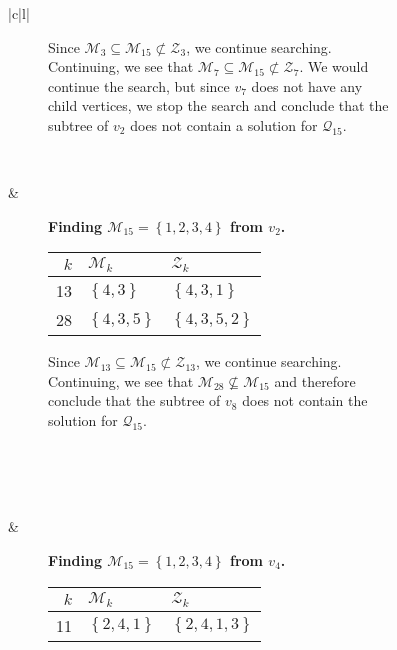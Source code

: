\begin{figure}[ht!]
\begin{tabular}[t]{|c|l|}
\begin{subfigure}[b]{0.64\textwidth}
        Since $\mathcal{M}_3 \subseteq \mathcal{M}_{15} \not \subset
        \mathcal{Z}_3$, we continue searching. Continuing, we see that
        $\mathcal{M}_7 \subseteq \mathcal{M}_{15} \not \subset \mathcal{Z}_7$.
        We would continue the search, but since $v_7$ does not have any child
        vertices, we stop the search and conclude that the subtree of $v_2$
        does not contain a solution for $\mathcal{Q}_{15}$.
        \\
    \end{subfigure}
    \\ \hline
    \begin{subfigure}[b]{0.35\textwidth}
        \centering
        
    \end{subfigure}
    & 
    \begin{subfigure}[b]{0.64\textwidth}
        \textbf{Finding $\mathcal{M}_{15} = \left\{{1,2,3,4}\right\}$ from $v_2$.} \\
        \begin{tabular}{rll}
            $k$ & $\mathcal{M}_k$            & $\mathcal{Z}_k$ \\ \hline
            13        & $\left\{{4,3}\right\}$     & $\left\{{4,3,1}\right\}$ \\ 
            28        & $\left\{{4,3,5}\right\}$   & $\left\{{4,3,5,2}\right\}$ \\ 
        \end{tabular}

        Since $\mathcal{M}_{13} \subseteq \mathcal{M}_{15} \not \subset
        \mathcal{Z}_{13}$, we continue searching. Continuing, we see that
        $\mathcal{M}_{28} \not \subseteq \mathcal{M}_{15}$ and therefore
        conclude that the subtree of $v_8$ does not contain the solution for
        $\mathcal{Q}_{15}$.
        \\
        \\
        \\
    \end{subfigure}
    \\ \hline
    \begin{subfigure}[b]{0.35\textwidth}
        \centering
        
    \end{subfigure}
    & 
    \begin{subfigure}[b]{0.64\textwidth}
        \textbf{Finding $\mathcal{M}_{15} = \left\{{1,2,3,4}\right\}$ from $v_4$.} \\
        \begin{tabular}{rll}
            $k$ & $\mathcal{M}_k$            & $\mathcal{Z}_k$ \\ \hline
            11        & $\left\{{2,4,1}\right\}$   & $\left\{{2,4,1,3}\right\}$ \\ 
        \end{tabular}


\end{subfigure}
\end{tabular}
\end{figure}
